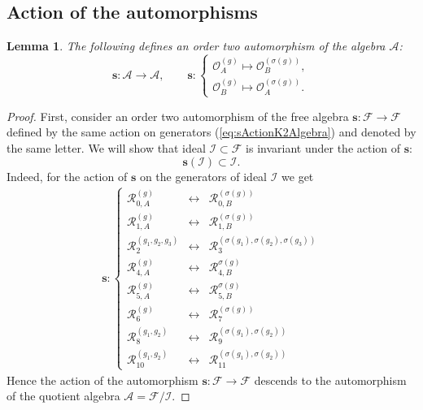 \documentclass{amsart}
\newtheorem{lemma}[theorem]{Lemma}
\newcommand{\Oa}{\mathcal O_A}
\newcommand{\Ob}{\mathcal O_B}
\newcommand{\R}{\mathcal R}
\begin{document}
\subsection{Action of the automorphisms}

\begin{lemma}
The following defines an order two automorphism of the algebra $\mathcal A$:
\begin{equation}
\mathbf s:\mathcal A\rightarrow\mathcal A,\qquad \mathbf s:\left\{\begin{array}{l}
\Oa^{(g)}\mapsto \Ob^{(\sigma(g))},\\[0.25em]
\Ob^{(g)}\mapsto \Oa^{(\sigma(g))}.
\end{array}\right.
\label{eq:sActionK2Algebra}
\end{equation}
\end{lemma}
\begin{proof}
First, consider an order two automorphism of the free algebra $\mathbf s:\mathcal F\rightarrow\mathcal F$ defined by the same action on generators (\ref{eq:sActionK2Algebra}) and denoted by the same letter. We will show that ideal $\mathcal I\subset\mathcal F$ is invariant under the action of $\mathbf s$:
\begin{equation*}
\mathbf s(\mathcal I)\subset\mathcal I.
\end{equation*}
Indeed, for the action of $\mathbf s$ on the generators of ideal $\mathcal I$ we get
\begin{align}
\mathbf s:\left\{\begin{array}{ccc}
\R_{0,A}^{(g)}&\leftrightarrow& \R_{0,B}^{(\sigma(g))}\\
\R_{1,A}^{(g)}&\leftrightarrow& \R_{1,B}^{(\sigma(g))}\\
\R_2^{(g_1,g_2,g_3)}&\leftrightarrow& \R_3^{(\sigma(g_1),\sigma(g_2),\sigma(g_3))}\\
\R_{4,A}^{(g)}&\leftrightarrow& \R_{4,B}^{\sigma(g)}\\
\R_{5,A}^{(g)}&\leftrightarrow& \R_{5,B}^{\sigma(g)}\\
\R_6^{(g)}&\leftrightarrow& \R_7^{(\sigma(g))}\\
\R_8^{(g_1,g_2)}&\leftrightarrow& \R_9^{(\sigma(g_1),\sigma(g_2))}\\
\R_{10}^{(g_1,g_2)}&\leftrightarrow& \R_{11}^{(\sigma(g_1),\sigma(g_2))}
\end{array}\right.
\label{eq:Z2SymmetryDefiningIdeal}
\end{align}
Hence the action of the automorphism $\mathbf s:\mathcal F\rightarrow\mathcal F$ descends to the automorphism of the quotient algebra $\mathcal A=\mathcal F/\mathcal I$.
\end{proof}
\end{document}
